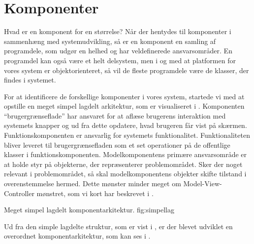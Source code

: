 \section{Komponenter}
\label{sec:komponenter}
Hvad er en komponent for en størrelse? Når der hentydes til komponenter i sammenhæng med systemudvikling, så er en komponent en samling af programdele, som udgør en helhed og har veldefinerede ansvarsområder. En programdel kan også være et helt delsystem, men i og med at platformen for vores system er objektorienteret, så vil de fleste programdele være de klasser, der findes i systemet.

For at identificere de forskellige komponenter i vores system, startede vi med at opstille en meget simpel lagdelt arkitektur, som er visualiseret i . 
Komponenten ``brugergrænseflade'' har ansvaret for at aflæse brugerens interaktion med systemets knapper og ud fra dette opdatere, hvad brugeren får vist på skærmen. 
Funktionskomponenten er ansvarlig for systemets funktionalitet. Funktionaliteten bliver leveret til brugergrænsefladen som et set operationer på de offentlige klasser i funktionskomponenten. 
Modelkomponentens primære ansvarsområde er at holde styr på objekterne, der repræsenterer problemområdet. Sker der noget relevant i problemområdet, så skal modelkomponentens objekter skifte tilstand i overenstemmelse hermed. 
Dette mønster minder meget om Model-View-Controller mønstret, som vi kort har beskrevet i .

	{Meget simpel lagdelt komponentarkitektur.}
	{fig:simpellag}

Ud fra den simple lagdelte struktur, som er vist i , er der blevet udviklet en overordnet komponentarkitektur, som kan ses i .




